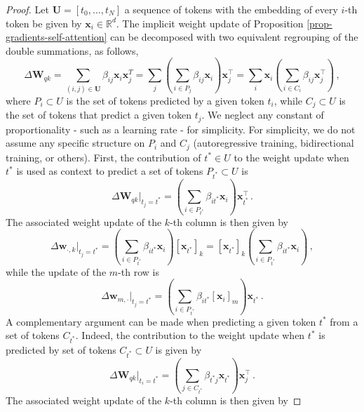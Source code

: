 \begin{proof}
%
Let $\bm{U} = [t_0, \dots, t_N]$ a sequence of tokens with the embedding of every $i$-th token be given by $\bm{x}_i \in \mathbb{R}^d$.
%
The implicit weight update of Proposition \ref{prop-gradients-self-attention} can be decomposed with two equivalent regrouping of the double summations, as follows,
%
\begin{equation}
\Delta \bm{W}_{qk} = \sum_{(i,j) \in \bm{U}} \beta_{ij}\bm{x}_i\bm{x}_j^T 
= \sum_j \left(\sum_{i\in P_j} \beta_{ij}\bm{x}_i\right)\bm{x}^\top_j
= \sum_i \bm{x}_i\left(\sum_{i\in C_i} \beta_{ij}\bm{x}^\top_j\right)\,,
\end{equation}
%
where $P_{i} \subset U$ is the set of tokens predicted by a given token $t_i$, while $C_{j} \subset U$ is the set of tokens that predict a given token $t_j$.
%
%
We neglect any constant of proportionality - such as a learning rate - for simplicity.
%
%
For simplicity, we do not assume any specific structure on $P_i$ and $C_j$ (autoregressive training, bidirectional training, or others).
%
First, the contribution of $t^* \in U$ to the weight update when $t^*$ is used as context to predict a set of tokens $P_{t^*} \subset U$ is
\begin{equation}
\Delta \bm{W}_{qk} \bigg|_{t_j = t^*}
= \left(\sum_{i\in P_{t^*}} \beta_{it^*}\bm{x}_i\right)\bm{x}^\top_{t^*}\,.
\end{equation}
%
The associated weight update of the $k$-th column is then given by
%
\begin{equation}
    \Delta \bm{w}_{\cdot, k} \bigg|_{t_j = t^*} = 
    \left(\sum_{i\in P_{t^*}} \beta_{it^*}\bm{x}_i\right)[\bm{x}_{t^*}]_k
    =
    [\bm{x}_{t^*}]_k \left(\sum_{i \in P_{t^*}}\beta_{it^*}\bm{x}_i\right)\,,
\end{equation}
%
while the update of the $m$-th row is
%
\begin{equation}
    \Delta \bm{w}_{m, \cdot} \bigg|_{t_j = t^*} = \left(\sum_{i \in P_{t^*}}\beta_{it^*}[\bm{x}_i]_m\right)\bm{x}_{t^*} \,.
\end{equation}
%
A complementary argument can be made when predicting a given token $t^*$ from a set of tokens $C_{t^*}$.
%
Indeed, the contribution to the weight update when $t^*$ is predicted by set of tokens $C_{t^*} \subset U$ is given by 
%
\begin{equation}
\Delta \bm{W}_{qk} \bigg|_{t_i = t^*}
= \left(\sum_{j\in C_{t^*}} \beta_{t^*j}\bm{x}_{t^*}\right)\bm{x}_j^\top\,.
\end{equation}
%
The associated weight update of the $k$-th column is then given by

\end{proof}
